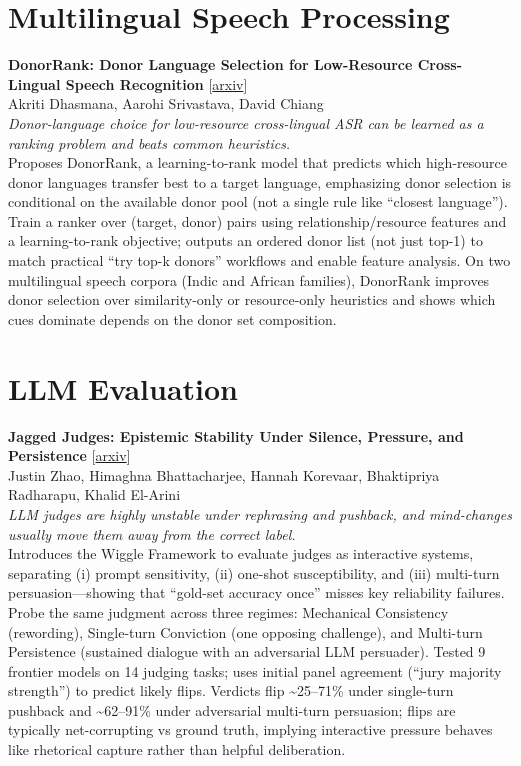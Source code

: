 \documentclass[12pt,letterpaper]{article}
\begin{document}
\medskip


\section*{Multilingual Speech Processing}

{\small\textbf{DonorRank: Donor Language Selection for Low-Resource Cross-Lingual Speech Recognition}} {\scriptsize[\href{https://arxiv.org/abs/2608.11441}{arxiv}]}\\
{\scriptsize Akriti Dhasmana, Aarohi Srivastava, David Chiang}\\

{\small\textit{Donor-language choice for low-resource cross-lingual ASR can be learned as a ranking problem and beats common heuristics.}}\\[1pt]
{\footnotesize Proposes DonorRank, a learning-to-rank model that predicts which high-resource donor languages transfer best to a target language, emphasizing donor selection is conditional on the available donor pool (not a single rule like ``closest language''). Train a ranker over (target, donor) pairs using relationship/resource features and a learning-to-rank objective; outputs an ordered donor list (not just top-1) to match practical ``try top-k donors'' workflows and enable feature analysis. On two multilingual speech corpora (Indic and African families), DonorRank improves donor selection over similarity-only or resource-only heuristics and shows which cues dominate depends on the donor set composition.}

\medskip


\section*{LLM Evaluation}

{\small\textbf{Jagged Judges: Epistemic Stability Under Silence, Pressure, and Persistence}} {\scriptsize[\href{https://arxiv.org/abs/2608.12645}{arxiv}]}\\
{\scriptsize Justin Zhao, Himaghna Bhattacharjee, Hannah Korevaar, Bhaktipriya Radharapu, Khalid El-Arini}\\

{\small\textit{LLM judges are highly unstable under rephrasing and pushback, and mind-changes usually move them away from the correct label.}}\\[1pt]
{\footnotesize Introduces the Wiggle Framework to evaluate judges as interactive systems, separating (i) prompt sensitivity, (ii) one-shot susceptibility, and (iii) multi-turn persuasion---showing that ``gold-set accuracy once'' misses key reliability failures. Probe the same judgment across three regimes: Mechanical Consistency (rewording), Single-turn Conviction (one opposing challenge), and Multi-turn Persistence (sustained dialogue with an adversarial LLM persuader). Tested 9 frontier models on 14 judging tasks; uses initial panel agreement (``jury majority strength'') to predict likely flips. Verdicts flip \textasciitilde{}25--71\% under single-turn pushback and \textasciitilde{}62--91\% under adversarial multi-turn persuasion; flips are typically net-corrupting vs ground truth, implying interactive pressure behaves like rhetorical capture rather than helpful deliberation.}
\end{document}
